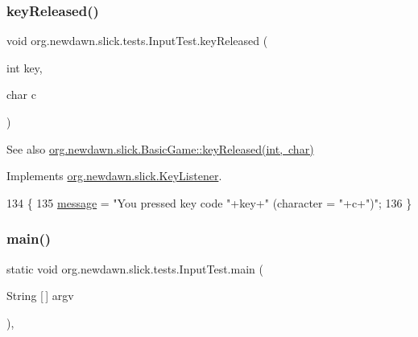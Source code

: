 \subsubsection{\texorpdfstring{key\+Released()}{keyReleased()}}
{\footnotesize\ttfamily void org.\+newdawn.\+slick.\+tests.\+Input\+Test.\+key\+Released (\begin{DoxyParamCaption}\item[{int}]{key,  }\item[{char}]{c }\end{DoxyParamCaption})\hspace{0.3cm}{\ttfamily [inline]}}

\begin{DoxySeeAlso}{See also}
\mbox{\hyperlink{classorg_1_1newdawn_1_1slick_1_1_basic_game_ae8ce436f93206f0b251a0fbf2a345849}{org.\+newdawn.\+slick.\+Basic\+Game\+::key\+Released(int, char)}} 
\end{DoxySeeAlso}


Implements \mbox{\hyperlink{interfaceorg_1_1newdawn_1_1slick_1_1_key_listener_a474673b59bc77266bcef3c261c26ee2b}{org.\+newdawn.\+slick.\+Key\+Listener}}.


\begin{DoxyCode}
134                                              \{
135         \mbox{\hyperlink{classorg_1_1newdawn_1_1slick_1_1tests_1_1_input_test_a998b4c1fcea34c27835b531bd6afa539}{message}} = \textcolor{stringliteral}{"You pressed key code "}+key+\textcolor{stringliteral}{" (character = "}+c+\textcolor{stringliteral}{")"};
136     \}
\end{DoxyCode}
\mbox{\label{classorg_1_1newdawn_1_1slick_1_1tests_1_1_input_test_a5b1062b96aedd0e1952daa50bcb8a8f9}} 
\subsubsection{\texorpdfstring{main()}{main()}}
{\footnotesize\ttfamily static void org.\+newdawn.\+slick.\+tests.\+Input\+Test.\+main (\begin{DoxyParamCaption}\item[{String \mbox{[}$\,$\mbox{]}}]{argv }\end{DoxyParamCaption})\hspace{0.3cm}{\ttfamily [inline]}, {\ttfamily [static]}}

